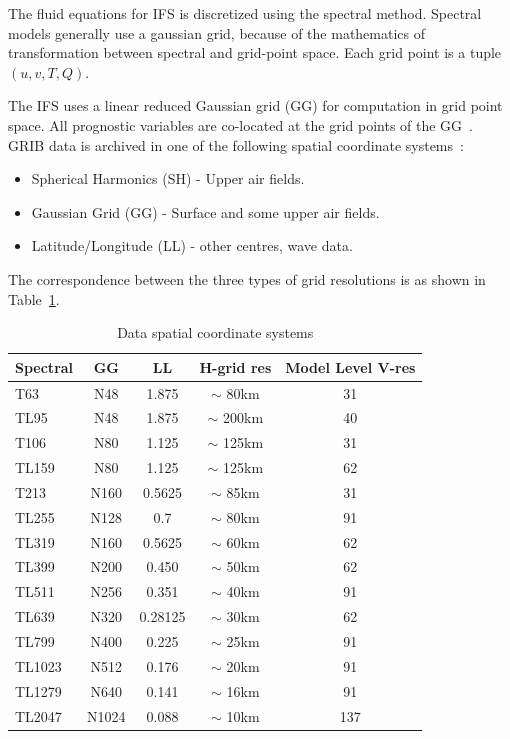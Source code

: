 \fi

The fluid equations for IFS is discretized using the spectral method. Spectral models generally use a gaussian grid, 
because of the mathematics of transformation between spectral and grid-point space. Each grid point is a tuple $(u, v, T, Q)$. 

The \gls{IFS} uses a linear reduced Gaussian grid (GG) for computation in grid point space. All prognostic variables are co-located at the grid points of the GG~\cite{ifs-meta}. %
\gls{GRIB} data is archived in one of the following spatial coordinate systems~\cite{spatial-ecmwf}:   
\begin{itemize}
    \item Spherical Harmonics (SH) - Upper air fields.
    \item Gaussian Grid (GG) - Surface and some upper air fields.
    \item Latitude/Longitude (LL) - other centres, wave data.
\end{itemize}
The correspondence between the three types of grid resolutions is as shown in Table~\ref{tab:spac-coord}.
    
\begin{table}[h!]
\centering
\begin{tabular}{|l|c|c|c|c|}
    \hline      
    Spectral  & GG  & LL & H-grid res & Model Level V-res\\
    \hline
    T63  & N48  & 1.875 & $\sim$ 80km & 31\\
    TL95  & N48  & 1.875 & $\sim$ 200km & 40\\
    T106  & N80  & 1.125 & $\sim$ 125km & 31 \\
    TL159  & N80  & 1.125 & $\sim$ 125km & 62\\
    T213  & N160  & 0.5625 & $\sim$ 85km & 31\\
    TL255  & N128  & 0.7 & $\sim$ 80km & 91\\
    TL319  & N160  & 0.5625 & $\sim$ 60km & 62\\
    TL399  & N200  & 0.450 & $\sim$ 50km & 62 \\
    TL511  & N256  & 0.351 & $\sim$ 40km & 91 \\
    TL639  & N320  & 0.28125 & $\sim$ 30km & 62\\
    TL799  & N400  & 0.225 & $\sim$ 25km & 91\\
    TL1023  & N512  & 0.176 & $\sim$ 20km & 91\\
    TL1279  & N640  & 0.141 & $\sim$ 16km & 91\\
    TL2047  & N1024  & 0.088 & $\sim$ 10km & 137\\  
    \hline
\end{tabular}
\caption{Data spatial coordinate systems}
\label{tab:spac-coord}
\end{table}  

